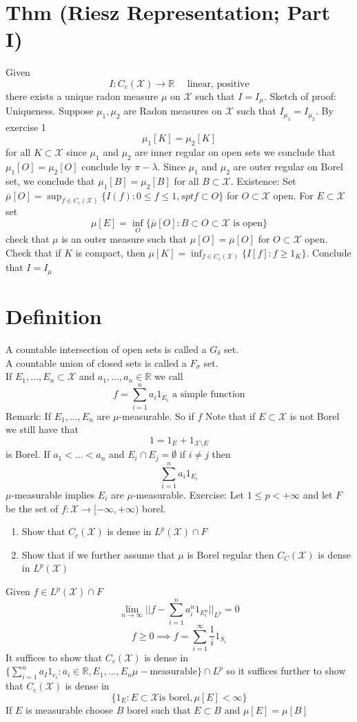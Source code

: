 \documentclass[11pt]{article}
\begin{document}
\section{Thm (Riesz Representation; Part I)}
Given 
 \[
     I : C_c( \mathcal{X}) \to \mathbb{R} \quad \text{ linear, positive}
\] 
there exists a unique radon measure $\mu$ on $ \mathcal{X}$ such that $I = I_\mu$.
Sketch of proof:
Uniqueness. Suppose $\mu_1,\mu_2$ are Radon measures on $ \mathcal{X}$ such that $I_{\mu_1} = I_{\mu_2}$.
By exercise 1 
\[
    \mu_1[K] = \mu_2[K]
\] 
for all $K \subset \mathcal{X}$ since $\mu_1$ and $\mu_2$ are inner regular on open sets we conclude that $\mu_1[O] = \mu_2[O]$ conclude by $\pi-\lambda$. 
Since $\mu_1$ and $\mu_2$ are outer regular on Borel set, we conclude that $\mu_1[B] = \mu_2[B]$ for all $B \subset \mathcal{X}$.
Existence: Set $ \overline{\mu}[O] = \sup_{f \in C_c( \mathcal{X})}\{I(f) : 0\le f \le 1, spt f \subset O\}$ for $O \subset \mathcal{X}$ open.
For $E \subset \mathcal{X}$ set
\[
    \mu[E] = \inf_{O} \{\overline{\mu}[O]: B \subset O \subset \mathcal{X} \text{ is open}\}
\] 
check that $\mu$ is an outer measure such that $\mu[O] = \overline{\mu}[O]$ for $O \subset \mathcal{X}$ open.
Check that if $K$ is compact, then $\mu[K] = \inf_{f \in C_c( \mathcal{X})}\{I[f] : f \ge 1_K\}$.
Conclude that $I = I_\mu$

\section{Definition}
A countable intersection of open sets is called a $G_\delta$ set.\\
A countable union of closed sets is called a $F_\sigma$ set.\\
If $E_1,\dots,E_n \subset \mathcal{X}$ and $a_1,\dots,a_n \in \mathbb{R}$ we call 
\[
    f = \sum_{i=1}^{n}a_i 1_{E_i} \text{ a simple function}
\] 
Remark: If  $E_1,\dots,E_n$ are $\mu$-measurable. So if $f$ Note that if  $E \subset \mathcal{X}$ is not Borel we still have that
\[
    1 = 1_E + 1_{ \mathcal{X} \setminus E}
\] 
is Borel.
If $a_1 < \dots < a_n$ and $E_i \cap E_j = \emptyset$ if  $i \ne j$ then
 \[
     \sum_{i=1}^{n}a_i 1_{E_i} 
\] 
$\mu$-measurable implies $E_i$ are  $\mu$-measurable.
Exercise: Let $1 \le p < +\infty$ and let $F$ be the set of  $f: \mathcal{X} \to [-\infty,+\infty)$ borel.
\begin{enumerate}
    \item Show that $C_c( \mathcal{X})$ is dense in $ L^{p}( \mathcal{X}) \cap F$
    \item Show that if we further assume that $\mu$ is Borel regular then $ C_C( \mathcal{X})$ is dense in $L^{p}( \mathcal{X})$
\end{enumerate}
Given $f \in L^{p}( \mathcal{X}) \cap F$
 \[
     \lim_{n\to \infty}||f - \sum_{i=1}^{n}a_i^{n }1_{E_i^{n}} ||_{L^{p}} = 0
\] 
\[
   f\ge 0 \implies  f = \sum_{i=1}^{\infty}\frac{1}{i} 1_{S_i}
\] 
It suffices to show that $C_c( \mathcal{X})$ is dense in $\{\sum_{i=1}^{n}a_I 1_{e_i}: a_i \in \mathbb{R}, E_1,\dots,E_n  \mu-\text{measurable}\} \cap L^{p}$ 
so it suffices further to show that $C_c( \mathcal{X})$ is dense in
\[
    \{1_E : E \subset \mathcal{X} \text{is borel}, \mu[E] < \infty\}
\] 
If $E$ is measurable choose  $B$ borel such that  $E \subset B$ and $\mu[E] = \mu[B]$
\end{document}
